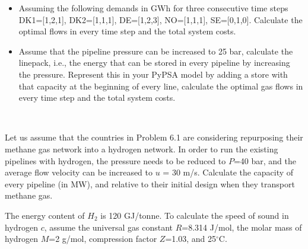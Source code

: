 \documentclass[10pt]{article}
\newenvironment{problem}[2][Problem]{\begin{trivlist}
\item[\hskip \labelsep {\bfseries #1}\hskip \labelsep {\bfseries #2.}]}{\end{trivlist}}
\begin{document}
\begin{problem}{6.1}
\begin{itemize}
\item[d)] Assuming the following demands in GWh for three consecutive time steps DK1=[1,2,1], DK2=[1,1,1], DE=[1,2,3], NO=[1,1,1], SE=[0,1,0]. Calculate the optimal flows in every time step and the total system costs. 

\item[e)] Assume that the pipeline pressure can be increased to 25 bar, calculate the linepack, i.e., the energy that can be stored in every pipeline by increasing the pressure. Represent this in your PyPSA model by adding a store with that capacity at the beginning of every line, calculate the optimal gas flows in every time step and the total system costs.

\end{itemize}


\end{problem}

\

\begin{problem}{6.2}
Let us assume that the countries in Problem 6.1 are considering repurposing their methane gas network into a hydrogen network. In order to run the existing pipelines with hydrogen, the pressure needs to be reduced to $P$=40 bar, and the average flow velocity can be increased to $u$ = 30 m/s. Calculate the capacity of every pipeline (in MW), and relative to their initial design when they transport methane gas. 

The energy content of $H_2$ is 120 GJ/tonne. To calculate the speed of sound in hydrogen $c$, assume the universal gas constant $R$=8.314 J/mol, the molar mass of hydrogen $M$=2 g/mol, compression factor $Z$=1.03, and 25$^{\circ}$C.


\end{problem}



\end{document}
